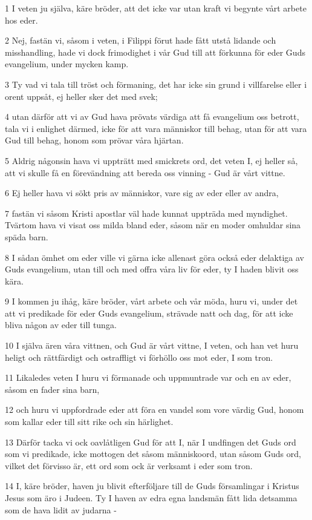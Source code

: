\par 1 I veten ju själva, käre bröder, att det icke var utan kraft vi begynte vårt arbete hos eder.
\par 2 Nej, fastän vi, såsom i veten, i Filippi förut hade fått utstå lidande och misshandling, hade vi dock frimodighet i vår Gud till att förkunna för eder Guds evangelium, under mycken kamp.
\par 3 Ty vad vi tala till tröst och förmaning, det har icke sin grund i villfarelse eller i orent uppsåt, ej heller sker det med svek;
\par 4 utan därför att vi av Gud hava prövats värdiga att få evangelium oss betrott, tala vi i enlighet därmed, icke för att vara människor till behag, utan för att vara Gud till behag, honom som prövar våra hjärtan.
\par 5 Aldrig någonsin hava vi uppträtt med smickrets ord, det veten I, ej heller så, att vi skulle få en förevändning att bereda oss vinning - Gud är vårt vittne.
\par 6 Ej heller hava vi sökt pris av människor, vare sig av eder eller av andra,
\par 7 fastän vi såsom Kristi apostlar väl hade kunnat uppträda med myndighet. Tvärtom hava vi visat oss milda bland eder, såsom när en moder omhuldar sina späda barn.
\par 8 I sådan ömhet om eder ville vi gärna icke allenast göra också eder delaktiga av Guds evangelium, utan till och med offra våra liv för eder, ty I haden blivit oss kära.
\par 9 I kommen ju ihåg, käre bröder, vårt arbete och vår möda, huru vi, under det att vi predikade för eder Guds evangelium, strävade natt och dag, för att icke bliva någon av eder till tunga.
\par 10 I själva ären våra vittnen, och Gud är vårt vittne, I veten, och han vet huru heligt och rättfärdigt och ostraffligt vi förhöllo oss mot eder, I som tron.
\par 11 Likaledes veten I huru vi förmanade och uppmuntrade var och en av eder, såsom en fader sina barn,
\par 12 och huru vi uppfordrade eder att föra en vandel som vore värdig Gud, honom som kallar eder till sitt rike och sin härlighet.
\par 13 Därför tacka vi ock oavlåtligen Gud för att I, när I undfingen det Guds ord som vi predikade, icke mottogen det såsom människoord, utan såsom Guds ord, vilket det förvisso är, ett ord som ock är verksamt i eder som tron.
\par 14 I, käre bröder, haven ju blivit efterföljare till de Guds församlingar i Kristus Jesus som äro i Judeen. Ty I haven av edra egna landsmän fått lida detsamma som de hava lidit av judarna -
